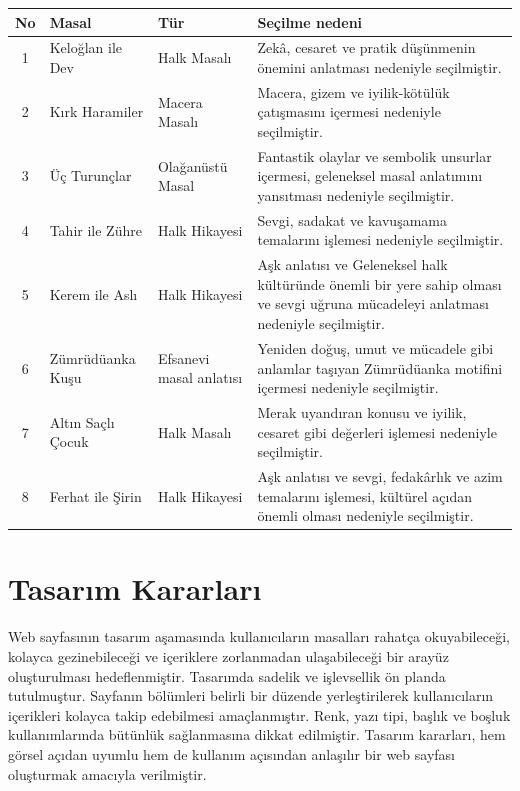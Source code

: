 \documentclass[12pt,a4paper]{article}
\begin{document}
\begin{longtable}{@{}cp{4cm}p{3cm}p{5.4cm}@{}}
\toprule
\textbf{No} & \textbf{Masal} & \textbf{Tür} & \textbf{Seçilme nedeni} \\
\midrule
\endhead
1 & Keloğlan ile Dev & Halk Masalı & Zekâ, cesaret ve pratik düşünmenin önemini anlatması
nedeniyle seçilmiştir.  \\
2 & Kırk Haramiler & Macera Masalı & Macera, gizem ve iyilik-kötülük çatışmasını içermesi
nedeniyle seçilmiştir. \\
3 & Üç Turunçlar & Olağanüstü Masal & Fantastik olaylar ve sembolik unsurlar içermesi,
geleneksel masal anlatımını yansıtması nedeniyle
seçilmiştir. \\
4 & Tahir ile Zühre & Halk Hikayesi & Sevgi, sadakat ve kavuşamama temalarını işlemesi
nedeniyle seçilmiştir. \\
5 & Kerem ile Aslı & Halk Hikayesi & Aşk anlatısı ve Geleneksel halk kültüründe önemli bir yere sahip
olması ve sevgi uğruna mücadeleyi anlatması
nedeniyle seçilmiştir. \\
6 & Zümrüdüanka Kuşu & Efsanevi masal anlatısı & Yeniden doğuş, umut ve mücadele gibi anlamlar
taşıyan Zümrüdüanka motifini içermesi nedeniyle
seçilmiştir. \\
7 & Altın Saçlı Çocuk & Halk Masalı & Merak uyandıran konusu ve iyilik, cesaret gibi
değerleri işlemesi nedeniyle seçilmiştir. \\
8 & Ferhat ile Şirin & Halk Hikayesi & Aşk anlatısı ve sevgi, fedakârlık ve azim temalarını işlemesi,
kültürel açıdan önemli olması nedeniyle
seçilmiştir.  \\
\bottomrule
\end{longtable}

\section{Tasarım Kararları}
Web sayfasının tasarım aşamasında kullanıcıların masalları
rahatça okuyabileceği, kolayca gezinebileceği ve içeriklere
zorlanmadan ulaşabileceği bir arayüz oluşturulması
hedeflenmiştir. Tasarımda sadelik ve işlevsellik ön planda
tutulmuştur. Sayfanın bölümleri belirli bir düzende
yerleştirilerek kullanıcıların içerikleri kolayca takip
edebilmesi amaçlanmıştır. Renk, yazı tipi, başlık ve
boşluk kullanımlarında bütünlük sağlanmasına dikkat
edilmiştir. Tasarım kararları, hem görsel açıdan uyumlu
hem de kullanım açısından anlaşılır bir web sayfası
oluşturmak amacıyla verilmiştir.
\end{document}
